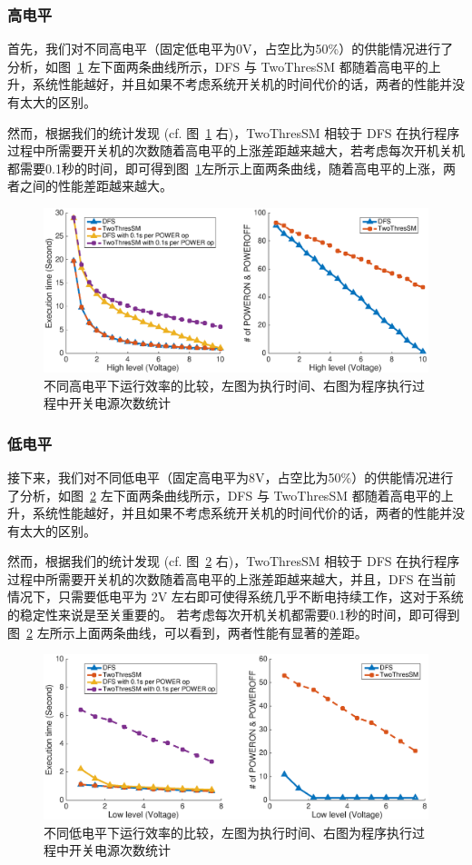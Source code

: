 \documentclass[a4paper,titlepage]{report}
\begin{document}
\subsubsection{高电平}
首先，我们对不同高电平（固定低电平为0V，占空比为50\%）的供能情况进行了分析，如图~\ref{high} 左下面两条曲线所示，DFS 与 TwoThresSM 都随着高电平的上升，系统性能越好，并且如果不考虑系统开关机的时间代价的话，两者的性能并没有太大的区别。

然而，根据我们的统计发现 (cf. 图~\ref{high} 右)，TwoThresSM 相较于 DFS 在执行程序过程中所需要开关机的次数随着高电平的上涨差距越来越大，若考虑每次开机关机都需要0.1秒的时间，即可得到图~\ref{high}左所示上面两条曲线，随着高电平的上涨，两者之间的性能差距越来越大。
\begin{figure}[!htbp]
\centering
\includegraphics[width = 5.5in]{high.eps}
\caption{不同高电平下运行效率的比较，左图为执行时间、右图为程序执行过程中开关电源次数统计}
\label{high}
\end{figure}


\subsubsection{低电平}
接下来，我们对不同低电平（固定高电平为8V，占空比为50\%）的供能情况进行了分析，如图~\ref{low} 左下面两条曲线所示，DFS 与 TwoThresSM 都随着高电平的上升，系统性能越好，并且如果不考虑系统开关机的时间代价的话，两者的性能并没有太大的区别。

然而，根据我们的统计发现 (cf. 图~\ref{low} 右)，TwoThresSM 相较于 DFS 在执行程序过程中所需要开关机的次数随着高电平的上涨差距越来越大，并且，DFS 在当前情况下，只需要低电平为 2V 左右即可使得系统几乎不断电持续工作，这对于系统的稳定性来说是至关重要的。
若考虑每次开机关机都需要0.1秒的时间，即可得到图~\ref{low} 左所示上面两条曲线，可以看到，两者性能有显著的差距。
\begin{figure}[!htbp]
\centering
\includegraphics[width = 5.5in]{low.eps}
\caption{不同低电平下运行效率的比较，左图为执行时间、右图为程序执行过程中开关电源次数统计}
\label{low}
\end{figure}
\end{document}
